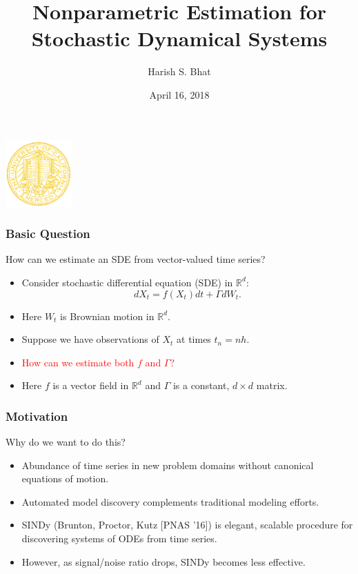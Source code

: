 \documentclass{beamer}
\title[SIAM UQ'18]{Nonparametric Estimation for\\Stochastic Dynamical Systems}
\author[HSB]{Harish S. Bhat}
\institute[UCM]{Applied Mathematics Unit\\University of California, Merced}
\date[April 16, 2018]{April 16, 2018}
\begin{document}
\begin{frame}
 \titlepage
 \begin{center}
\includegraphics[width=1.0in]{UCMercedSealGold.eps}
 \end{center}
\end{frame}

\begin{frame}
\frametitle{Basic Question}
\begin{block}{How can we estimate an SDE from vector-valued time series?}
\begin{itemize}
\item Consider stochastic differential equation (SDE) in $\mathbb{R}^d$:
$$
d X_t = f(X_t) dt + \Gamma dW_t.
$$
\item Here $W_t$ is Brownian motion in $\mathbb{R}^d$.
\item Suppose we have observations of $X_t$ at times $t_n = n h$.
\item \textcolor{red}{How can we estimate both $f$ and $\Gamma$?}
\item Here $f$ is a vector field in $\mathbb{R}^d$ and $\Gamma$ is a constant, $d \times d$ matrix.
\end{itemize}
\end{block}
\end{frame}

\begin{frame}
\frametitle{Motivation}
\begin{block}{Why do we want to do this?}
\begin{itemize}
\item Abundance of time series in new problem domains without canonical equations of motion.
\item Automated model discovery complements traditional modeling efforts.
\item SINDy (Brunton, Proctor, Kutz [PNAS '16]) is elegant, scalable procedure for discovering systems of ODEs from time series.
\item However, as signal/noise ratio drops, SINDy becomes less effective.
\end{itemize}
\end{block}
\end{frame}
\end{document}
